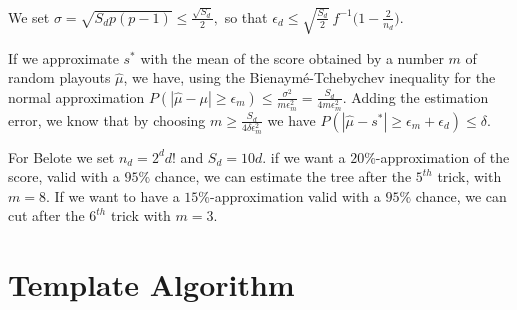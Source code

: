 \documentclass[runningheads]{llncs}
\begin{document}
We set
\noindent$\sigma = \sqrt{S_dp(p-1)} \leq \frac{\sqrt {S_d}}{2},$
so that
$\epsilon_d \leq \sqrt{\frac {S_d}2} ~ f^{-1}\big(1-\frac2{n_d}\big).$


If we approximate $s^*$ with the mean of the score obtained by a number $m$ of random playouts $\hat{\mu}$, we have, using the Bienaymé-Tchebychev inequality for the normal approximation
$P(|\hat{\mu} - \mu| \geq \epsilon_m) \leq \frac{\sigma^2}{m\epsilon_m^2} = \frac {S_d}{4m\epsilon_m^2}.$
Adding the estimation error, we know that by choosing 
$m \geq \frac{S_d}{4\delta \epsilon_m^2}$ we have 
$P(|\hat{\mu} - s^*| \geq \epsilon_m + \epsilon_d) \leq \delta.$


For Belote we set $n_d = 2^d d!$ and $S_d = 10d$. %
%
if we want a $20$\%-approximation of the score, valid with a $95\%$ chance, we can estimate the tree after the $5^{th}$ trick, with $m = 8$. If we want to have a $15\%$-approximation valid with a $95\%$ chance, we can cut after the $6^{th}$ trick with $m = 3$.


\section{Template Algorithm}
\label{minimax}
\end{document}
